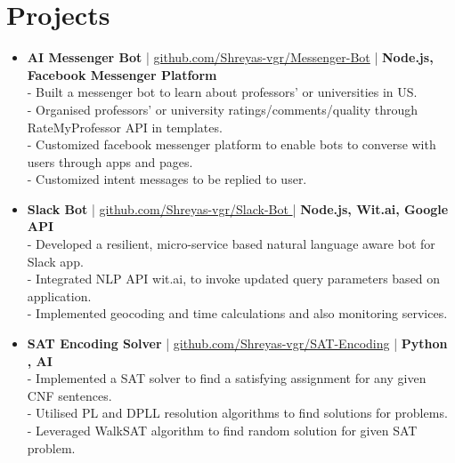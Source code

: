 \section {Projects}
\begin{itemize}
 \item \textbf{AI Messenger Bot} | \href{https://github.com/Shreyas-vgr/Messenger-Bot}{github.com/Shreyas-vgr/Messenger-Bot} | \textbf{Node.js, Facebook Messenger Platform}\\
 - Built a messenger bot to learn about professors' or universities in US.\\
 - Organised professors' or university ratings/comments/quality through RateMyProfessor API in templates.\\
 - Customized facebook messenger platform to enable bots to converse with users through apps and pages.\\
 - Customized intent messages to be replied to user.

 \item \textbf{Slack Bot} | \href{https://github.com/Shreyas-vgr/Slack-Bot}{github.com/Shreyas-vgr/Slack-Bot }| \textbf{Node.js, Wit.ai, Google API}\\
 - Developed a resilient, micro-service based natural language aware bot for Slack app.\\
 - Integrated NLP API wit.ai, to invoke updated query parameters based on application.\\
 - Implemented geocoding and time calculations and also monitoring services.

 \item \textbf{SAT Encoding Solver} | \href{https://github.com/Shreyas-vgr/SAT-Encoding}{github.com/Shreyas-vgr/SAT-Encoding} | \textbf{Python , AI}\\
 - Implemented a SAT solver to find a satisfying assignment for any given CNF sentences.\\
 - Utilised PL and DPLL resolution algorithms to find solutions for problems.\\
 - Leveraged WalkSAT algorithm to find random solution for given SAT problem.



\end{itemize}
